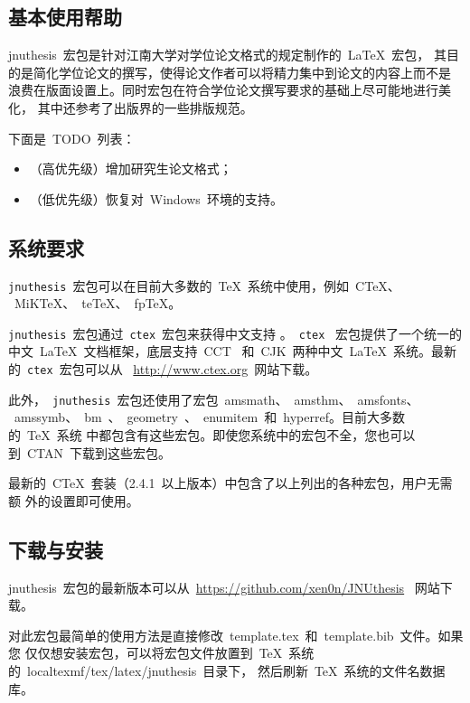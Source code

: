\documentclass[pdftex, twoside, bachelor]{JNUthesis}
\begin{document}
\begin{spacing}{1.25}
\chapter{基本使用帮助}
\label{C:intro}

jnuthesis~宏包是针对江南大学对学位论文格式的规定制作的~\LaTeX{}~宏包，
其目的是简化学位论文的撰写，使得论文作者可以将精力集中到论文的内容上而不是
浪费在版面设置上。同时宏包在符合学位论文撰写要求的基础上尽可能地进行美化，
其中还参考了出版界的一些排版规范。

下面是~TODO~列表：

\begin{itemize}

\item （高优先级）增加研究生论文格式；

\item （低优先级）恢复对~Windows~环境的支持。

\end{itemize}

\section{系统要求}

\texttt{jnuthesis}~宏包可以在目前大多数的~\TeX{}~系统中使用，例如~C\TeX{}、
 ~MiK\TeX{}、~te\TeX{}、~fp\TeX{}。

\texttt{jnuthesis}~宏包通过~\texttt{ctex}~宏包来获得中文支持
。~\texttt{ctex}~ 宏包提供了一个统一的中文~\LaTeX{}~文档框架，底层支持~CCT~
和~CJK~两种中文~\LaTeX{}~系统。最新的~\texttt{ctex}~宏包可以从~
\url{http://www.ctex.org}~网站下载。

此外，~\texttt{jnuthesis}~宏包还使用了宏包~amsmath、~amsthm、~amsfonts、
 ~amssymb、~bm~、~geometry~、~enumitem~和~hyperref。目前大多数的~\TeX{}~系统
中都包含有这些宏包。即使您系统中的宏包不全，您也可以到~CTAN~下载到这些宏包。

最新的~C\TeX{}~套装（2.4.1~以上版本）中包含了以上列出的各种宏包，用户无需额
外的设置即可使用。

\section{下载与安装}

jnuthesis~宏包的最新版本可以从~\url{https://github.com/xen0n/JNUthesis}~
网站下载。

对此宏包最简单的使用方法是直接修改~template.tex~和~template.bib~文件。如果您
仅仅想安装宏包，可以将宏包文件放置到~\TeX{}~系统的~localtexmf/tex/latex/jnuthesis~目录下，
然后刷新~\TeX{}~系统的文件名数据库。


\end{spacing}
\end{document}
